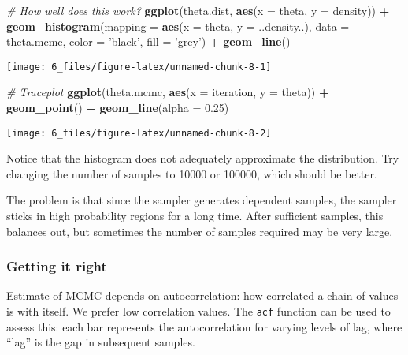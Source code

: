 \documentclass[]{article}
\newenvironment{Shaded}{\begin{snugshade}}{\end{snugshade}}
\newcommand{\CommentTok}[1]{\textcolor[rgb]{0.56,0.35,0.01}{\textit{#1}}}
\newcommand{\DataTypeTok}[1]{\textcolor[rgb]{0.13,0.29,0.53}{#1}}
\newcommand{\FloatTok}[1]{\textcolor[rgb]{0.00,0.00,0.81}{#1}}
\newcommand{\KeywordTok}[1]{\textcolor[rgb]{0.13,0.29,0.53}{\textbf{#1}}}
\newcommand{\NormalTok}[1]{#1}
\newcommand{\OperatorTok}[1]{\textcolor[rgb]{0.81,0.36,0.00}{\textbf{#1}}}
\newcommand{\StringTok}[1]{\textcolor[rgb]{0.31,0.60,0.02}{#1}}
\begin{document}
\begin{Shaded}
\begin{Highlighting}[]
\CommentTok{# How well does this work?}
\KeywordTok{ggplot}\NormalTok{(theta.dist, }\KeywordTok{aes}\NormalTok{(}\DataTypeTok{x =}\NormalTok{ theta, }\DataTypeTok{y =}\NormalTok{ density)) }\OperatorTok{+}
\StringTok{  }\KeywordTok{geom_histogram}\NormalTok{(}\DataTypeTok{mapping =} \KeywordTok{aes}\NormalTok{(}\DataTypeTok{x =}\NormalTok{ theta, }\DataTypeTok{y =}\NormalTok{ ..density..), }\DataTypeTok{data =}\NormalTok{ theta.mcmc,}
                 \DataTypeTok{color =} \StringTok{'black'}\NormalTok{, }\DataTypeTok{fill =} \StringTok{'grey'}\NormalTok{) }\OperatorTok{+}
\StringTok{  }\KeywordTok{geom_line}\NormalTok{()}
\end{Highlighting}
\end{Shaded}

\begin{center}\texttt{[image: 6\_files/figure-latex/unnamed-chunk-8-1]} \end{center}

\begin{Shaded}
\begin{Highlighting}[]
\CommentTok{# Traceplot}
\KeywordTok{ggplot}\NormalTok{(theta.mcmc, }\KeywordTok{aes}\NormalTok{(}\DataTypeTok{x =}\NormalTok{ iteration, }\DataTypeTok{y =}\NormalTok{ theta)) }\OperatorTok{+}
\StringTok{  }\KeywordTok{geom_point}\NormalTok{() }\OperatorTok{+}
\StringTok{  }\KeywordTok{geom_line}\NormalTok{(}\DataTypeTok{alpha =} \FloatTok{0.25}\NormalTok{)}
\end{Highlighting}
\end{Shaded}

\begin{center}\texttt{[image: 6\_files/figure-latex/unnamed-chunk-8-2]} \end{center}

Notice that the histogram does not adequately approximate the
distribution. Try changing the number of samples to 10000 or 100000,
which should be better.

The problem is that since the sampler generates dependent samples, the
sampler sticks in high probability regions for a long time. After
sufficient samples, this balances out, but sometimes the number of
samples required may be very large.

\hypertarget{getting-it-right}{%
\subsubsection{Getting it right}\label{getting-it-right}}

Estimate of MCMC depends on autocorrelation: how correlated a chain of
values is with itself. We prefer low correlation values. The
\texttt{acf} function can be used to assess this: each bar represents
the autocorrelation for varying levels of lag, where ``lag'' is the gap
in subsequent samples.
\end{document}
